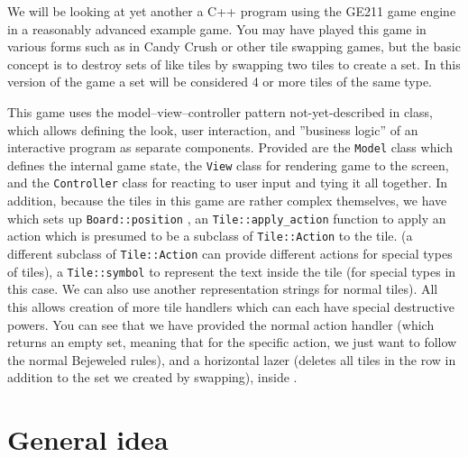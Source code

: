 \documentclass{tufte-handout}
\begin{document}
\maketitle

We will be looking at yet another a C++ program using the GE211 game
engine in a reasonably advanced example game. You may have played this game
in various forms such as in Candy Crush or other tile swapping games, but the
basic concept is to destroy sets of like tiles by swapping two tiles to
create a set. In this version of the game a set will be considered 4 or more
tiles of the same type.

This game uses the model--view--controller pattern not-yet-described in
class, which allows defining the look, user interaction, and ''business
logic'' of an interactive program as separate components. Provided are
the \texttt{Model} class which defines the internal game state, the
\texttt{View} class for rendering game to the screen, and the
\texttt{Controller} class for reacting to user input and tying it all
together. In addition, because the tiles in this game are rather complex
themselves, we have  which sets up \texttt{Board::position}
,  an \texttt{Tile::apply_action} function to apply an action which is presumed to be a subclass of \texttt{Tile::Action} to the tile. (a different subclass of \texttt{Tile::Action} can provide different actions for special types of
tiles), a \texttt{Tile::symbol} to represent the text inside the tile (for special types in this case. We can also use another representation strings for normal tiles). All this allows creation of more tile handlers
which can each have special destructive powers. You can see that we have provided
the normal action handler (which returns an empty set, meaning that for the specific action, we just want to follow the normal Bejeweled rules), and a horizontal
lazer (deletes all tiles in the row in addition to the set we created by swapping),
inside .

\CxxPrelims

\section{General idea}
\end{document}

